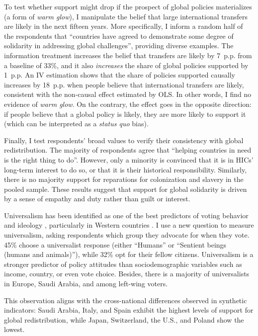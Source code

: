 \documentclass[12pt,english]{article}
\begin{document}
\begin{bibunit}
To test whether support might drop if the prospect of global policies materializes (a form of \textit{warm glow}), I manipulate the belief that large international transfers are likely in the next fifteen years. More specifically, I inform a random half of the respondents that ``countries have agreed to demonstrate some degree of solidarity in addressing global challenges'', providing diverse examples. The information treatment increases the belief that transfers are likely by 7~p.p. from a baseline of 33\%, and it also \textit{increases} the share of global policies supported by 1~p.p. An IV estimation shows that the share of policies supported causally increases by 18~p.p. when people believe that international transfers are likely, consistent with the non-causal effect estimated by OLS. In other words, I find no evidence of \textit{warm glow}. On the contrary, the effect goes in the opposite direction: if people believe that a global policy is likely, they are more likely to support it (which can be interpreted as a \textit{status quo} bias).

Finally, I test respondents' broad values to verify their consistency with global redistribution. The majority of respondents agree that ``helping countries in need is the right thing to do''. However, only a minority is convinced that it is in HICs' long-term interest to do so, or that it is their historical responsibility. Similarly, there is no majority support for reparations for colonization and slavery in the pooled sample. These results suggest that support for global solidarity is driven by a sense of empathy and duty rather than guilt or interest.

Universalism has been identified as one of the best predictors of voting behavior \citep{enke_moral_2020} and ideology \citep{enke_moral_2023,cappelen_universalism_2025},
particularly in Western countries \citep{cappelen_universalism_2025}.
I use a new question to measure universalism, asking respondents which group they advocate for when they vote. 45\% choose a universalist response (either ``Humans'' or ``Sentient beings (humans and animals)''), while 32\% opt for their fellow citizens. Universalism is a stronger predictor of policy attitudes than sociodemographic variables such as income, country, or even vote choice. Besides, there is a majority of universalists in Europe, Saudi Arabia, and among left-wing voters.

This observation aligns with the cross-national differences observed in synthetic indicators: Saudi Arabia, Italy, and Spain exhibit the highest levels of support for global redistribution, while Japan, Switzerland, the U.S., and Poland show the lowest.


\end{bibunit}
\end{document}

